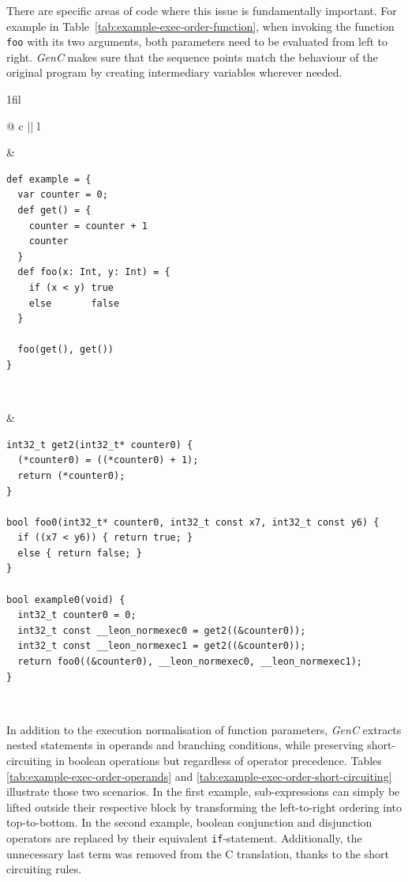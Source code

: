 \documentclass{article}
\makeatletter
\newcommand{\inlineC}[1]{\lstinline[language=C99]|#1|}
\newcommand{\inlineScala}[1]{\lstinline[language=MyScala]|#1|}
\newcommand{\vheading}[1]{\rotatebox[origin=c]{90}{~\textbf{#1}~}}
\newcommand*{\centerfloat}{%
  \parindent \z@
  \leftskip \z@ \@plus 1fil \@minus \textwidth
  \rightskip\leftskip
  \parfillskip \z@skip}
\newcommand{\GenC}{\emph{GenC}\xspace}
\makeatother
\begin{document}
There are specific areas of code where this issue is fundamentally important.
For example in Table~\ref{tab:example-exec-order-function}, when invoking the
function \inlineScala{foo} with its two arguments, both parameters need to be
evaluated from left to right. \GenC makes sure that the sequence points match
the behaviour of the original program by creating intermediary variables
wherever needed.

\begin{table}[h]
  \centerfloat
  \begin{tabular}{@{} c || l}
    \toprule

    \vheading{Scala} &
    \begin{lstlisting}[language=MyScala]
def example = {
  var counter = 0;
  def get() = {
    counter = counter + 1
    counter
  }
  def foo(x: Int, y: Int) = {
    if (x < y) true
    else       false
  }

  foo(get(), get())
}
    \end{lstlisting} \\

    \midrule

    \vheading{C99} &
    \begin{lstlisting}[language=C99]
int32_t get2(int32_t* counter0) {
  (*counter0) = ((*counter0) + 1);
  return (*counter0);
}

bool foo0(int32_t* counter0, int32_t const x7, int32_t const y6) {
  if ((x7 < y6)) { return true; }
  else { return false; }
}

bool example0(void) {
  int32_t counter0 = 0;
  int32_t const __leon_normexec0 = get2((&counter0));
  int32_t const __leon_normexec1 = get2((&counter0));
  return foo0((&counter0), __leon_normexec0, __leon_normexec1);
}
    \end{lstlisting} \\

    \bottomrule
  \end{tabular}
  \caption{Example of execution normalisation of function call in C99}
  \label{tab:example-exec-order-function}
\end{table}

In addition to the execution normalisation of function parameters, \GenC
extracts nested statements in operands and branching conditions, while
preserving short-circuiting in boolean operations but regardless of operator
precedence.  Tables \ref{tab:example-exec-order-operands} and
\ref{tab:example-exec-order-short-circuiting} illustrate those two scenarios. In
the first example, sub-expressions can simply be lifted outside their respective
block by transforming the left-to-right ordering into top-to-bottom. In the
second example, boolean conjunction and disjunction operators are replaced by
their equivalent \inlineC{if}-statement. Additionally, the unnecessary last term
was removed from the C translation, thanks to the short circuiting rules.
\end{document}
